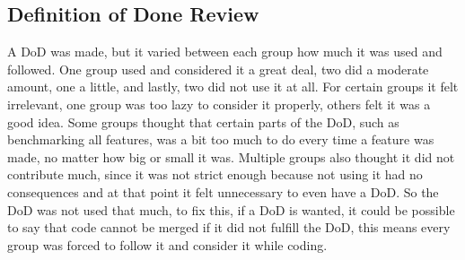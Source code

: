 \subsection{Definition of Done Review}\label{sec:DoDreview}
A DoD was made, but it varied between each group how much it was used and followed.
One group used and considered it a great deal, two did a moderate amount, one a little, and lastly, two did not use it at all.
For certain groups it felt irrelevant, one group was too lazy to consider it properly, others felt it was a good idea.
Some groups thought that certain parts of the DoD, such as benchmarking all features, was a bit too much to do every time a feature was made, no matter how big or small it was.
Multiple groups also thought it did not contribute much, since it was not strict enough because not using it had no consequences and at that point it felt unnecessary to even have a DoD.
So the DoD was not used that much, to fix this, if a DoD is wanted, it could be possible to say that code cannot be merged if it did not fulfill the DoD, this means every group was forced to follow it and consider it while coding.
